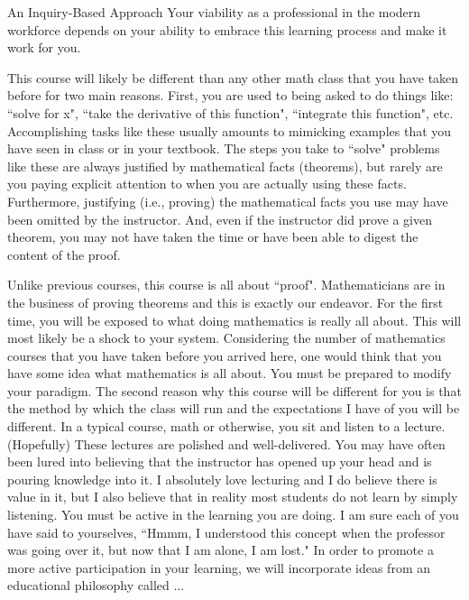 \begin{section}{An Inquiry-Based Approach}
Your viability as a professional in the modern workforce depends on your ability to embrace this learning process and make it work for you.


This course will likely be different than any other math class that you have taken before for two main reasons. First, you are used to being asked to do things like: ``solve for x", ``take the derivative of this function", ``integrate this function", etc. Accomplishing tasks like these usually amounts to mimicking examples that you have seen in class or in your textbook. The steps you take to ``solve" problems like these are always justified by mathematical facts (theorems), but rarely are you paying explicit attention to when you are actually using these facts. Furthermore, justifying (i.e., proving) the mathematical facts you use may have been omitted by the instructor. And, even if the instructor did prove a given theorem, you may not have taken the time or have been able to digest the content of the proof.

Unlike previous courses, this course is all about ``proof". Mathematicians are in the business of proving theorems and this is exactly our endeavor. For the first time, you will be exposed to what doing mathematics is really all about. This will most likely be a shock to your system. Considering the number of mathematics courses that you have taken before you arrived here, one would think that you have some idea what mathematics is all about. You must be prepared to modify your paradigm. The second reason why this course will be different for you is that the method by which the class will run and the expectations I have of you will be different. In a typical course, math or otherwise, you sit and listen to a lecture. (Hopefully) These lectures are polished and well-delivered. You may have often been lured into believing that the instructor has opened up your head and is pouring knowledge into it. I absolutely love lecturing and I do believe there is value in it, but I also believe that in reality most students do not learn by simply listening. You must be active in the learning you are doing. I am sure each of you have said to yourselves, ``Hmmm, I understood this concept when the professor was going over it, but now that I am alone, I am lost." In order to promote a more active participation in your learning, we will incorporate ideas from an educational philosophy called ...




\end{section}
